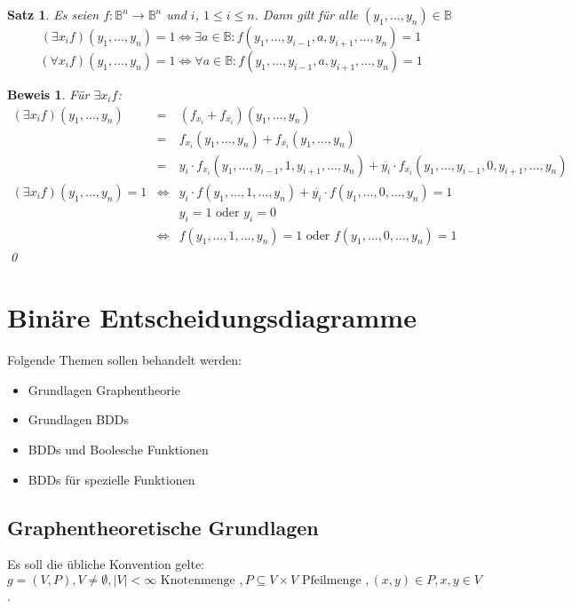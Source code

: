 \documentclass[ngerman]{scrartcl}
\theoremstyle{custom}
\newtheorem{ms}[mdef]{Satz}
\newtheorem*{bw}{Beweis}
\newcommand{\0}{\mathbf{0}}
\newcommand{\1}{\mathbf{L}}
\begin{document}
\begin{ms}
Es seien $f: \mathds{B}^n \rightarrow \mathds{B}^n$ und $i$, $1 \leq i
\leq n$. Dann gilt f\"ur alle $(y_1,\dots,y_n) \in \mathds{B}$
\begin{equation*}
(\exists x_i f)(y_1,\dots,y_n) =1 \Leftrightarrow \exists a \in
\mathds{B}: f(y_1,\dots,y_{i-1},a,y_{i+1},\dots, y_n) = 1
\end{equation*}
\begin{equation*}
(\forall x_i f)(y_1,\dots,y_n) =1 \Leftrightarrow \forall a \in
\mathds{B}: f(y_1,\dots,y_{i-1},a,y_{i+1},\dots, y_n) = 1
\end{equation*}
\end{ms}

\begin{bw}
F\"ur $\exists x_i f$:
\begin{eqnarray*}
(\exists x_i f)(y_1, \dots, y_n) &=& (f_{x_i} +
f_{\overline{x_i}})(y_1, \dots, y_n)\\
&=& f_{x_i}(y_1,\dots,y_n) + f_{\overline{x_i}}(y_1,\dots,y_n) \\
&=& y_i \cdot f_{x_i}(y_1,\dots,y_{i-1},1,y_{i+1},\dots,y_n) +
\overline{y_i} \cdot f_{\overline{x_i}}(y_1,\dots,
y_{i-1},0,y_{i+1},\dots, y_n)\\
(\exists x_i f)(y_1,\dots, y_n) = 1 &\Leftrightarrow& y_i \cdot
f(y_1,\dots, 1, \dots, y_n) + \overline{y_i} \cdot
f(y_1,\dots,0,\dots,y_n) =1 \\
&& y_i = 1 \text{ oder } y_i = 0 \\
&\Leftrightarrow& f(y_1,\dots,1,\dots,y_n) =1 \text{ oder }
f(y_1,\dots, 0, \dots, y_n) = 1
\end{eqnarray*}
\qed
\end{bw}

\newpage

\section{Bin\"are Entscheidungsdiagramme}
Folgende Themen sollen behandelt werden:
\begin{itemize}
\item Grundlagen Graphentheorie 
\item Grundlagen BDDs
\item BDDs und Boolesche Funktionen
\item BDDs f\"ur spezielle Funktionen
\end{itemize}

\subsection{Graphentheoretische Grundlagen}
Es soll die \"ubliche Konvention gelte:
$g=(V,P), V \not = \emptyset, \vert V \vert < \infty \text{ Knotenmenge },
P \subseteq V \times V \text{ Pfeilmenge }, (x,y) \in P, x,y \in V$.
\end{document}
